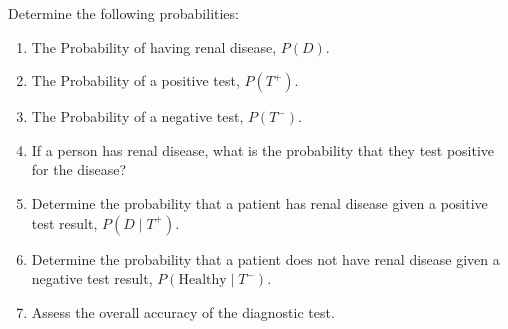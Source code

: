 \begin{example}
        Determine the following probabilities:
        \begin{enumerate}[label=(\alph*)]
            \item The Probability of having renal disease, $P(D)$.
            \item The Probability of a positive test,  \( P(T^+) \).
            \item The Probability of a negative test,  \( P(T^-) \).
            \item If a person has renal disease, what is the probability that they test positive for the disease?
            \item Determine the probability that a patient has renal disease given a positive test result, \( P(D \mid T^+) \).
            \item Determine the probability that a patient does not have renal disease given a negative test result, \( P(\text{Healthy} \mid T^-) \).
            \item Assess the overall accuracy of the diagnostic test.
        \end{enumerate}
        \label{ex:renal-disease}
\end{example}

